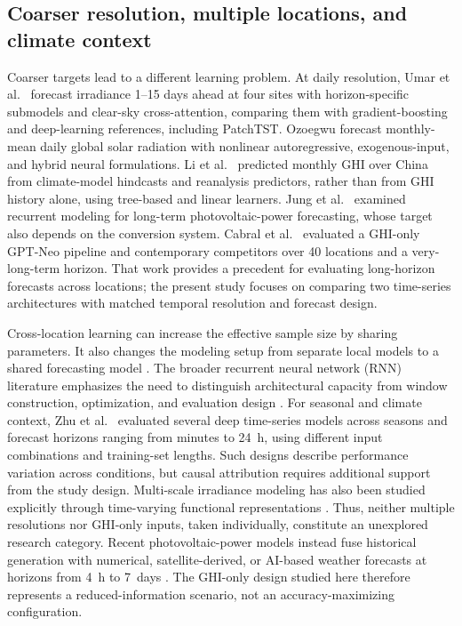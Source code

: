 \subsection{Coarser resolution, multiple locations, and climate context}

Coarser targets lead to a different learning problem. At daily resolution,
Umar et al.\ \cite{umar2026daily} forecast irradiance 1--15 days ahead at
four sites with horizon-specific submodels and clear-sky cross-attention,
comparing them with gradient-boosting and deep-learning references,
including PatchTST. Ozoegwu
\cite{ozoegwu2019} forecast monthly-mean daily global solar radiation with
nonlinear autoregressive, exogenous-input, and hybrid neural formulations.
Li et al.\ \cite{li2026monthly} predicted monthly GHI over China from
climate-model hindcasts and reanalysis predictors, rather than from GHI
history alone, using tree-based and linear learners.
Jung et al.\ \cite{jung2020} examined recurrent modeling for long-term
photovoltaic-power forecasting, whose target also depends on the conversion
system. Cabral et al.\ \cite{cabral2026} evaluated a GHI-only GPT-Neo
pipeline and contemporary competitors over 40 locations and a very-long-term
horizon. That work provides a precedent for evaluating long-horizon
forecasts across locations; the present study focuses on comparing two
time-series architectures with matched temporal resolution and forecast
design.

Cross-location learning can increase the effective sample size by sharing
parameters. It also changes the modeling setup from separate local models
to a shared forecasting model \cite{montero2021}. The broader recurrent
neural network (RNN) literature emphasizes the need to distinguish
architectural capacity from window construction, optimization, and
evaluation design \cite{hewamalage2021}. For seasonal and climate context,
Zhu et al.\ \cite{zhu2024} evaluated several deep time-series models across
seasons and forecast horizons ranging from minutes to 24~h, using different
input combinations and training-set lengths. Such designs describe
performance variation across conditions, but causal attribution requires
additional support from the study design.
Multi-scale irradiance modeling has also been studied explicitly through
time-varying functional representations \cite{shi2026multiscale}. Thus,
neither multiple resolutions nor GHI-only inputs, taken individually,
constitute an unexplored research category. Recent photovoltaic-power models
instead fuse historical generation with numerical, satellite-derived, or
AI-based weather forecasts at horizons from 4~h to 7~days
\cite{zhang2026rethinking}. The GHI-only design studied here therefore
represents a reduced-information scenario, not an accuracy-maximizing
configuration.

